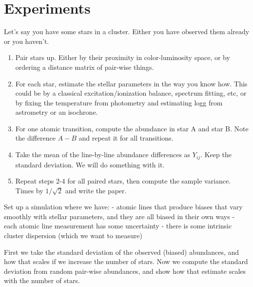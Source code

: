 \documentclass[modern]{aastex631}
\begin{document}

\section{Experiments} \label{sec:experiments}

Let's say you have some stars in a cluster. Either you have observed them already or you haven't.
\begin{enumerate}
    \item Pair stars up. Either by their proximity in color-luminosity space, or by ordering a distance matrix of pair-wise things.
    \item For each star, estimate the stellar parameters in the way you know how. This could be by a classical excitation/ionization balance, spectrum fitting, etc, or by fixing the temperature from photometry and estimating logg from astrometry or an isochrone.
    \item For one atomic transition, compute the abundance in star A and star B. Note the difference $A-B$ and repeat it for all transitions.
    \item Take the mean of the line-by-line abundance differences as $Y_{ij}$. Keep the standard deviation. We will do something with it.
    \item Repeat steps 2-4 for all paired stars, then compute the sample variance. Times by $1/\sqrt{2}$ and write the paper.
\end{enumerate}



Set up a simulation where we have:
- atomic lines that produce biases that vary smoothly with stellar parameters, and they are all biased in their own ways
- each atomic line measurement has some uncertainty
- there is some intrinsic cluster dispersion (which we want to measure)

First we take the standard deviation of the observed (biased) abundances, and how that scales if we increase the number of stars.
Now we compute the standard deviation from random pair-wise abundances, and show how that estimate scales with the number of stars.
\end{document}
